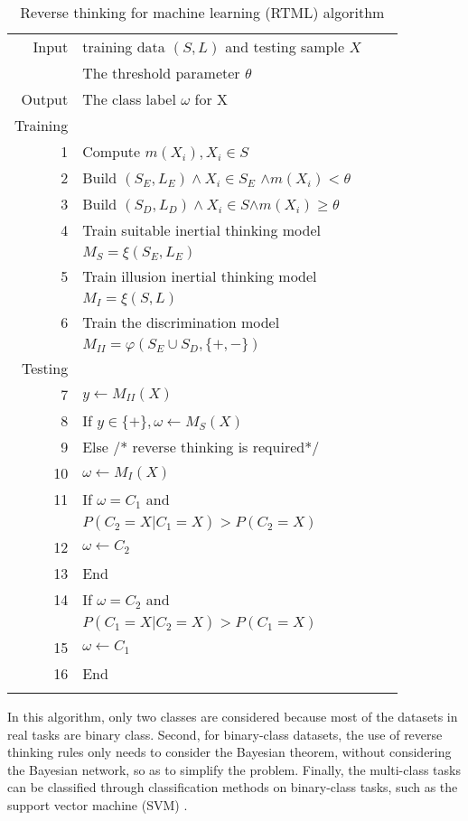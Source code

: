 \begin{table}[htbp]
\centering
\caption{Reverse thinking for machine learning (RTML) algorithm}
\label{Table2}
\begin{tabular}{rlll}
\hline\noalign{\smallskip}
Input &training data $(S,L)$ and testing sample $X$\\
      &The threshold parameter $\theta$\\
Output& The class label $\omega$ for X\\
\noalign{\smallskip}\hline\noalign{\smallskip}
Training &\\

1 &Compute $m(X_i),X_i\in S$ \\
2 &Build $(S_E,L_E ) \wedge X_i\in S_E$ $\wedge m(X_i)<\theta$\\
3 &Build $(S_D,L_D )\wedge  X_i\in S $$\wedge m(X_i)\geq\theta$\\
4 &Train suitable inertial thinking model \\
  &$M_S=\xi(S_E,L_E)$ \\
5 &Train illusion inertial thinking model\\
  &$M_I=\xi(S,L)$\\
6 &Train the discrimination model\\
  & $M_{II}=\varphi(S_E\cup S_D,\{+,-\})$\\
\noalign{\smallskip}\hline\noalign{\smallskip}
Testing&\\
7&$y\leftarrow M_{II}(X)$\\
8&If $y\in \{+\},\omega\leftarrow M_S(X)$\\
9& Else /* reverse thinking is required*/\\
10 &$\omega\leftarrow M_{I}(X)$\\
11 & If $\omega = C_1$ and \\
   & $P(C_2=X|C_1=X) > P(C_2=X)$\\
12 & $\omega\leftarrow C_2$\\
13 & End\\
14 & If $\omega = C_2$ and\\
   & $P(C_1=X|C_2=X) > P(C_1=X)$\\
15 & $\omega\leftarrow C_1$\\
16 & End\\
\noalign{\smallskip}\hline
\end{tabular}
\end{table}

In this algorithm, only two classes are considered because most of the datasets in real tasks are binary class. Second, for binary-class datasets, the use of reverse thinking rules only needs to consider the Bayesian theorem, without considering the Bayesian network, so as to simplify the problem. Finally, the multi-class tasks can be classified through classification methods on binary-class tasks, such as the support vector machine (SVM) \cite{Ji2017}.

